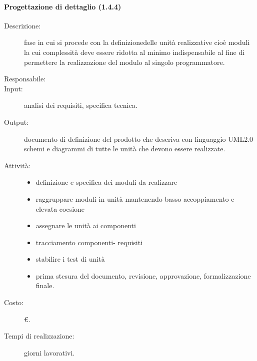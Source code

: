 \paragraph{Progettazione di dettaglio (1.4.4)}
\begin{description}
\item[Descrizione:] fase in cui si procede con la definizionedelle unità realizzative cioè moduli la cui complessità deve essere ridotta al minimo indispensabile al fine di permettere la realizzazione del modulo al singolo programmatore.
\item[Responsabile:] 
\item[Input:] analisi dei requisiti, specifica tecnica.
\item[Output:] documento di definizione del prodotto che descriva con linguaggio UML2.0 schemi e diagrammi di tutte le unità che devono essere realizzate.
\item[Attività:]
\begin{itemize}
\item definizione e specifica dei moduli da realizzare
\item raggruppare moduli in unità mantenendo basso accoppiamento e elevata coesione
\item assegnare le unità ai componenti
\item tracciamento componenti- requisiti
\item stabilire i test di unità
\item prima stesura del documento, revisione, approvazione, formalizzazione finale.
\end{itemize}
\item[Costo:] \euro{}.
\item[Tempi di realizzazione:]  giorni lavorativi.
\end{description}

